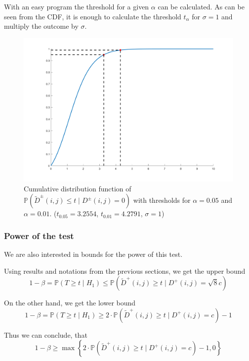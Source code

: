\documentclass{beamer}
\begin{document}
\begin{frame}
	With an easy program the threshold for a given $\alpha$ can be calculated. As can be seen from the CDF, it is enough to calculate the threshold $t_\alpha$ for $\sigma = 1$ and multiply the outcome by $\sigma$.
	\begin{figure}
		\includegraphics[width=0.6\linewidth]{Testing/CDF}
		\caption[CDF]{Cumulative distribution function of $\mathbb{P}(\tilde{D}^\pm(i, j) \leq t \mid D^\pm(i, j) = 0)$ with thresholds for $\alpha = 0.05$ and $\alpha = 0.01$. ($t_{0.05} = 3.2554$, $t_{0.01} = 4.2791$, $\sigma = 1$)}
		\label{fig:CDF}
	\end{figure}
\end{frame}

\subsubsection{Power of the test}

\begin{frame}
	We are also interested in bounds for the power of this test.
	
	Using results and notations from the previous sections, we get the upper bound
	\begin{equation*}
		1 - \beta = \mathbb{P}(T \geq t \mid H_1) \leq \mathbb{P}(\tilde{D}^+(i, j) \geq t \mid D^+(i, j) = \sqrt{8} c)
	\end{equation*}
	
	On the other hand, we get the lower bound
	\begin{equation*}
		1 - \beta = \mathbb{P}(T \geq t \mid H_1) \geq 2 \cdot \mathbb{P}(\tilde{D}^+(i, j) \geq t \mid D^+(i, j) = c) - 1
	\end{equation*}
	
	Thus we can conclude, that
	\begin{equation*}
		1 - \beta \geq \max \left\{ 2 \cdot \mathbb{P}(\tilde{D}^+(i, j) \geq t \mid D^+(i, j) = c) - 1, 0 \right\}
	\end{equation*}
\end{frame}
\end{document}
